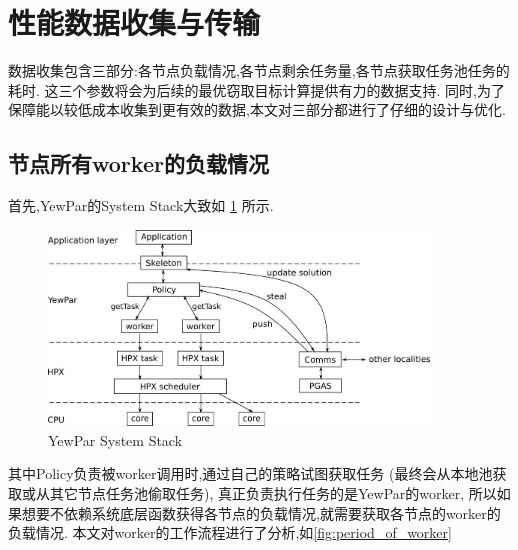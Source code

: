\documentclass{mproj}
\begin{document}

\section{性能数据收集与传输}
数据收集包含三部分:各节点负载情况,各节点剩余任务量,各节点获取任务池任务的耗时.
这三个参数将会为后续的最优窃取目标计算提供有力的数据支持.
同时,为了保障能以较低成本收集到更有效的数据,本文对三部分都进行了仔细的设计与优化.

\subsection{节点所有worker的负载情况}
首先,YewPar的System Stack大致如
\cref{fig:yewpar_system_stack}
\cite{10.1007/978-3-030-29400-7_14}
所示.

\begin{figure}[h] %
    \centering %
    \includegraphics[width=0.9\textwidth]{images/YewPar_System_Stack.jpg} %
    \caption{YewPar System Stack} %
    \label{fig:yewpar_system_stack} %
\end{figure}
\FloatBarrier

其中Policy负责被worker调用时,通过自己的策略试图获取任务
(最终会从本地池获取或从其它节点任务池偷取任务),
真正负责执行任务的是YewPar的worker,
所以如果想要不依赖系统底层函数获得各节点的负载情况,就需要获取各节点的worker的负载情况.
本文对worker的工作流程进行了分析,如\cref{fig:period_of_worker}
\end{document}
